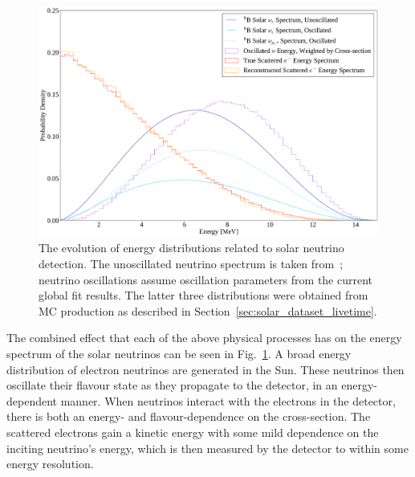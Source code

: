 \begin{figure}[!th]
    \centering
    \includegraphics[width=\textwidth]{6_SolarAnalysis/images/b8_energy_evolution_new.pdf}
    \caption[The evolution of energy distributions related to \beight{} solar neutrino detection]{The evolution of energy distributions related to \beight{} solar neutrino detection. The unoscillated neutrino spectrum is taken from~\cite{winterB8NeutrinoSpectrum2006}; %
    neutrino oscillations assume oscillation parameters from the current global fit results. The latter three distributions were obtained from MC production as described in Section~\ref{sec:solar_dataset_livetime}.%
    }
    \label{fig:nu_elec_energy_dependence2}
\end{figure}

The combined effect that each of the above physical processes has on the energy spectrum of the solar neutrinos can be seen in Fig.~\ref{fig:nu_elec_energy_dependence2}. A broad energy distribution of \beight{} electron neutrinos are generated in the Sun. These neutrinos then oscillate their flavour state as they propagate to the detector, in an energy-dependent manner. When neutrinos interact with the electrons in the detector, there is both an energy- and flavour-dependence on the cross-section. The scattered electrons gain a kinetic energy with some mild dependence on the inciting neutrino's energy, which is then measured by the detector to within some energy resolution.

